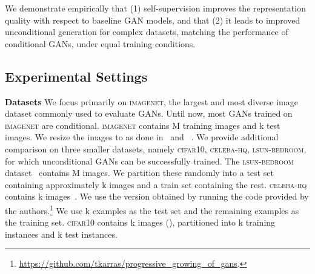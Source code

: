 \documentclass[10pt,twocolumn,letterpaper]{article}
\newcommand{\celebahq}{\textsc{celeba-hq}}
\newcommand{\lsun}{\textsc{lsun-bedroom}}
\newcommand{\cifar}{\textsc{cifar10}}
\newcommand{\imagenet}{\textsc{imagenet}}
\begin{document}
We demonstrate empirically that
(1) self-supervision improves the representation quality with respect to baseline GAN models, and that
(2) it leads to improved unconditional generation for complex datasets, matching the performance of conditional GANs, under equal training conditions.

\subsection{Experimental Settings}

\noindent\textbf{Datasets}\quad
We focus primarily on \imagenet{}, the largest and most diverse image dataset commonly used to evaluate GANs.
Until now, most GANs trained on \imagenet{} are conditional.
\imagenet{} contains M training images and k test images.
We resize the images to  as done in~\citet{miyato2018cgans} and ~\citet{zhang2018self}.
We provide additional comparison on three smaller datasets, namely
\cifar{}, \celebahq{}, \lsun{}, for which unconditional GANs can be successfully trained.
The \lsun{} dataset~\citep{yu15lsun} contains M images.
We partition these randomly into a test set containing approximately k images and a train set containing the rest.
\celebahq{} contains k images~\citep{karras2017progressive}.
We use the  version obtained by running the code provided by the authors.\footnote{\url{https://github.com/tkarras/progressive\_growing\_of\_gans}.}
We use k examples as the test set and the remaining examples as the training set.  \cifar{} contains k images (),
partitioned into k training instances and k test instances.
\end{document}
